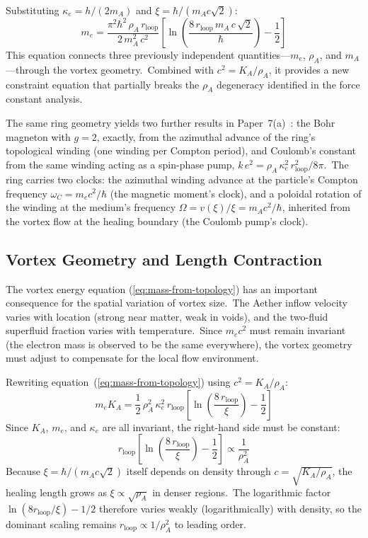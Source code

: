 ﻿\documentclass[12pt,letterpaper]{article}
\newcommand{\rhoa}{\rho_{\!A}}
\newcommand{\Ka}{K_{\!A}}
\begin{document}
Substituting $\kappa_e = h/(2m_A)$ and $\xi = \hbar/(m_A c \sqrt{2})$:
%
\begin{equation}
  m_e = \frac{\pi^2 \hbar^2\,\rhoa\,r_{\mathrm{loop}}}{2\,m_A^2\,c^2}
    \left[\ln\!\left(\frac{8\,r_{\mathrm{loop}}\,m_A\,c\,\sqrt{2}}{\hbar}\right)
    - \frac{1}{2}\right]
\end{equation}
%
This equation connects three previously independent quantities---$m_e$, $\rhoa$,
and $m_A$---through the vortex geometry.\ Combined with $c^2 = \Ka/\rhoa$, it
provides a new constraint equation that partially breaks the $\rhoa$ degeneracy
identified in the force constant analysis.

The same ring geometry yields two further results in
Paper~7(a)~\cite{otto-boundcore}: the Bohr magneton with $g = 2$, exactly,
from the azimuthal advance of the ring's topological winding (one winding
per Compton period), and Coulomb's constant from the same winding acting
as a spin-phase pump, $k\,e^2 = \rhoa\,\kappa_e^2\,r_{\mathrm{loop}}^2/8\pi$.\
The ring carries two clocks: the azimuthal winding advance at the
particle's Compton frequency $\omega_C = m_e c^2/\hbar$ (the magnetic
moment's clock), and a poloidal rotation of the winding at the medium's
frequency $\Omega = v(\xi)/\xi = m_A c^2/\hbar$, inherited from the vortex
flow at the healing boundary (the Coulomb pump's clock).


\subsection{Vortex Geometry and Length Contraction}

The vortex energy equation (\ref{eq:mass-from-topology}) has an important
consequence for the spatial variation of vortex size.\ The Aether inflow velocity
varies with location (strong near matter, weak in voids), and the two-fluid
superfluid fraction varies with temperature.\ Since $m_e c^2$ must remain
invariant (the electron mass is observed to be the same everywhere), the vortex
geometry must adjust to compensate for the local flow environment.

Rewriting equation~(\ref{eq:mass-from-topology}) using $c^2 = \Ka/\rhoa$:
%
\begin{equation}
  m_e \Ka = \frac{1}{2}\,\rhoa^2\,\kappa_e^2\,r_{\mathrm{loop}}
    \left[\ln\!\left(\frac{8\,r_{\mathrm{loop}}}{\xi}\right) - \frac{1}{2}\right]
\end{equation}
%
Since $\Ka$, $m_e$, and $\kappa_e$ are all invariant, the right-hand side must
be constant:
%
\begin{equation}
  r_{\mathrm{loop}} \left[\ln\!\left(\frac{8\,r_{\mathrm{loop}}}{\xi}\right)
  - \frac{1}{2}\right] \propto \frac{1}{\rhoa^2}
\end{equation}
%
Because $\xi = \hbar/(m_A c\sqrt{2})$ itself depends on density through
$c = \sqrt{\Ka/\rhoa}$, the healing length grows as $\xi \propto \sqrt{\rhoa}$
in denser regions.\ The logarithmic factor $\ln(8r_{\mathrm{loop}}/\xi) - 1/2$
therefore varies weakly (logarithmically) with density, so the dominant
scaling remains $r_{\mathrm{loop}} \propto 1/\rhoa^2$ to leading order.
\end{document}
